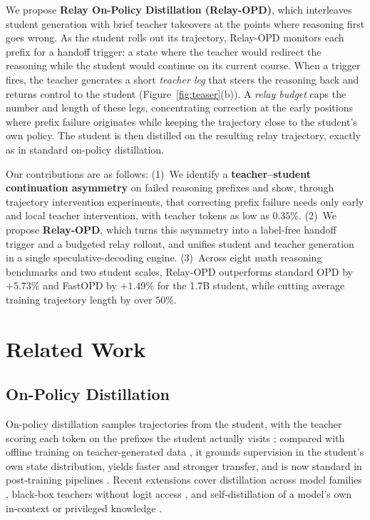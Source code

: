 \documentclass{article} %
\begin{document}
We propose \textbf{Relay On-Policy Distillation (Relay-OPD)}, which interleaves student generation with brief teacher takeovers at the points where reasoning first goes wrong. As the student rolls out its trajectory, Relay-OPD monitors each prefix for a handoff trigger: a state where the teacher would redirect the reasoning while the student would continue on its current course. When a trigger fires, the teacher generates a short \emph{teacher leg} that steers the reasoning back and returns control to the student (Figure~\ref{fig:teaser}(b)). A \emph{relay budget} caps the number and length of these legs, concentrating correction at the early positions where prefix failure originates while keeping the trajectory close to the student's own policy. The student is then distilled on the resulting relay trajectory, exactly as in standard on-policy distillation.

Our contributions are as follows: (1)~We identify a \textbf{teacher--student continuation asymmetry} on failed reasoning prefixes and show, through trajectory intervention experiments, that correcting prefix failure needs only early and local teacher intervention, with teacher tokens as low as $0.35\%$. (2)~We propose \textbf{Relay-OPD}, which turns this asymmetry into a label-free handoff trigger and a budgeted relay rollout, and unifies student and teacher generation in a single speculative-decoding engine. (3)~Across eight math reasoning benchmarks and two student scales, Relay-OPD outperforms standard OPD by $+5.73\%$ and FastOPD by $+1.49\%$ for the 1.7B student, while cutting average training trajectory length by over $50\%$.


\section{Related Work}\label{sec:related}

\subsection{On-Policy Distillation}\label{subsec:online-distillation}

On-policy distillation samples trajectories from the student, with the teacher scoring each token on the prefixes the student actually visits \citep{agarwal2024policy,gu2024minillm}; compared with offline training on teacher-generated data \citep{hinton2015distilling,kim2016sequence}, it grounds supervision in the student's own state distribution, yields faster and stronger transfer, and is now standard in post-training pipelines \citep{yang2025qwen3,lu2025onpolicydistillation}. Recent extensions cover distillation across model families \citep{patino2025unlocking}, black-box teachers without logit access \citep{ye2025black}, and self-distillation of a model's own in-context or privileged knowledge \citep{yang2025distilling,hubotter2026reinforcement,shenfeld2026self,zhao2026self,penaloza2026privileged}.\par
\end{document}
